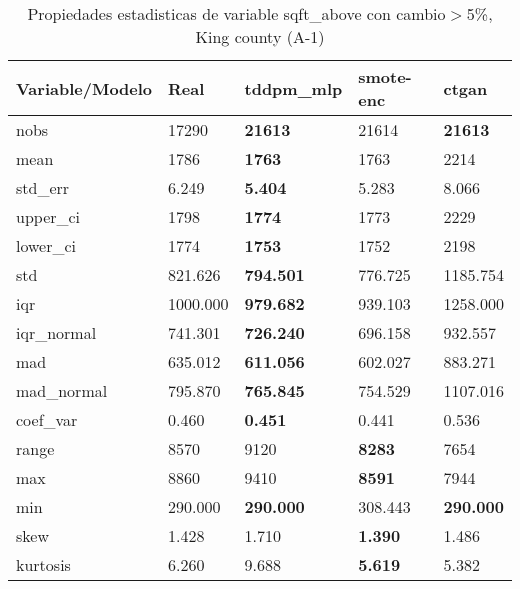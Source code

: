 \begin{table}[H]
\centering
\fontsize{8}{14}\selectfont
\caption{Propiedades estadisticas de variable sqft\_above con cambio\ensuremath{>}5\%, King county (A-1)}
\label{table-stats-king county-a-1-sqft_above-short}
\begin{tabular}{|l|m{10em}|m{10em}|m{10em}|m{10em}|}
\hline
 \rowcolor[gray]{0.8}
Variable/Modelo & Real & tddpm\_mlp & smote-enc & ctgan \\
\hline nobs & 17290 & \bfseries 21613 & \cellcolor[rgb]{0.9, 0.54, 0.52} 21614 & \bfseries 21613 \\
\hline mean & 1786 & \bfseries 1763 & 1763 & \cellcolor[rgb]{0.9, 0.54, 0.52} 2214 \\
\hline std\_err & 6.249 & \bfseries 5.404 & 5.283 & \cellcolor[rgb]{0.9, 0.54, 0.52} 8.066 \\
\hline upper\_ci & 1798 & \bfseries 1774 & 1773 & \cellcolor[rgb]{0.9, 0.54, 0.52} 2229 \\
\hline lower\_ci & 1774 & \bfseries 1753 & 1752 & \cellcolor[rgb]{0.9, 0.54, 0.52} 2198 \\
\hline std & 821.626 & \bfseries 794.501 & 776.725 & \cellcolor[rgb]{0.9, 0.54, 0.52} 1185.754 \\
\hline iqr & 1000.000 & \bfseries 979.682 & 939.103 & \cellcolor[rgb]{0.9, 0.54, 0.52} 1258.000 \\
\hline iqr\_normal & 741.301 & \bfseries 726.240 & 696.158 & \cellcolor[rgb]{0.9, 0.54, 0.52} 932.557 \\
\hline mad & 635.012 & \bfseries 611.056 & 602.027 & \cellcolor[rgb]{0.9, 0.54, 0.52} 883.271 \\
\hline mad\_normal & 795.870 & \bfseries 765.845 & 754.529 & \cellcolor[rgb]{0.9, 0.54, 0.52} 1107.016 \\
\hline coef\_var & 0.460 & \bfseries 0.451 & 0.441 & \cellcolor[rgb]{0.9, 0.54, 0.52} 0.536 \\
\hline range & 8570 & 9120 & \bfseries 8283 & \cellcolor[rgb]{0.9, 0.54, 0.52} 7654 \\
\hline max & 8860 & 9410 & \bfseries 8591 & \cellcolor[rgb]{0.9, 0.54, 0.52} 7944 \\
\hline min & 290.000 & \bfseries 290.000 & \cellcolor[rgb]{0.9, 0.54, 0.52} 308.443 & \bfseries 290.000 \\
\hline skew & 1.428 & \cellcolor[rgb]{0.9, 0.54, 0.52} 1.710 & \bfseries 1.390 & 1.486 \\
\hline kurtosis & 6.260 & \cellcolor[rgb]{0.9, 0.54, 0.52} 9.688 & \bfseries 5.619 & 5.382 \\

\end{tabular}
\end{table}
